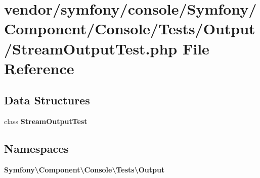 \section{vendor/symfony/console/\+Symfony/\+Component/\+Console/\+Tests/\+Output/\+Stream\+Output\+Test.php File Reference}
\label{_stream_output_test_8php}
\subsection*{Data Structures}
\begin{DoxyCompactItemize}
\item 
class {\bf Stream\+Output\+Test}
\end{DoxyCompactItemize}
\subsection*{Namespaces}
\begin{DoxyCompactItemize}
\item 
 {\bf Symfony\textbackslash{}\+Component\textbackslash{}\+Console\textbackslash{}\+Tests\textbackslash{}\+Output}
\end{DoxyCompactItemize}
